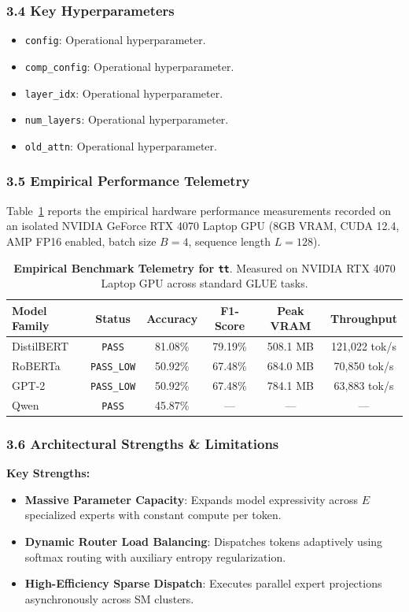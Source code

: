 \subsubsection*{3.4 Key Hyperparameters}
\begin{itemize}
    \item \texttt{config}: Operational hyperparameter.
    \item \texttt{comp\_config}: Operational hyperparameter.
    \item \texttt{layer\_idx}: Operational hyperparameter.
    \item \texttt{num\_layers}: Operational hyperparameter.
    \item \texttt{old\_attn}: Operational hyperparameter.
\end{itemize}

\subsubsection*{3.5 Empirical Performance Telemetry}
Table~\ref{tab:telemetry_tt} reports the empirical hardware performance measurements recorded on an isolated NVIDIA GeForce RTX 4070 Laptop GPU (8GB VRAM, CUDA 12.4, AMP FP16 enabled, batch size $B=4$, sequence length $L=128$).

\begin{table}[h]
\centering
\small
\caption{\textbf{Empirical Benchmark Telemetry for \texttt{tt}}. Measured on NVIDIA RTX 4070 Laptop GPU across standard GLUE tasks.}
\label{tab:telemetry_tt}
\begin{tabular*}{\columnwidth}{@{\extracolsep{\fill}}lccccc}
\toprule
\textbf{Model Family} & \textbf{Status} & \textbf{Accuracy} & \textbf{F1-Score} & \textbf{Peak VRAM} & \textbf{Throughput} \\
\midrule
DistilBERT & \texttt{PASS} & 81.08\% & 79.19\% & 508.1 MB & 121,022 tok/s \\
RoBERTa & \texttt{PASS\_LOW} & 50.92\% & 67.48\% & 684.0 MB & 70,850 tok/s \\
GPT-2 & \texttt{PASS\_LOW} & 50.92\% & 67.48\% & 784.1 MB & 63,883 tok/s \\
Qwen & \texttt{PASS} & 45.87\% & --- & --- & --- \\
\bottomrule
\end{tabular*}
\end{table}

\subsubsection*{3.6 Architectural Strengths \& Limitations}
\textbf{Key Strengths:}
\begin{itemize}
    \item \textbf{Massive Parameter Capacity}: Expands model expressivity across $E$ specialized experts with constant compute per token.
    \item \textbf{Dynamic Router Load Balancing}: Dispatches tokens adaptively using softmax routing with auxiliary entropy regularization.
    \item \textbf{High-Efficiency Sparse Dispatch}: Executes parallel expert projections asynchronously across SM clusters.
\end{itemize}

